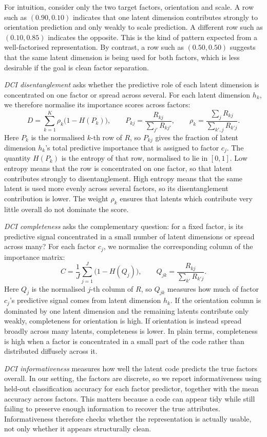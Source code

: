 For intuition, consider only the two target factors, orientation and scale. A row such as \((0.90,0.10)\) indicates that one latent dimension contributes strongly to orientation prediction and only weakly to scale prediction. A different row such as \((0.10,0.85)\) indicates the opposite. This is the kind of pattern expected from a well-factorised representation. By contrast, a row such as \((0.50,0.50)\) suggests that the same latent dimension is being used for both factors, which is less desirable if the goal is clean factor separation.

\emph{DCI disentanglement} asks whether the predictive role of each latent dimension is concentrated on one factor or spread across several. For each latent dimension \(h_k\), we therefore normalise its importance scores across factors:
\[
D=\sum_{k=1}^{K}\rho_k\bigl(1-H(P_k)\bigr),
\qquad
P_{kj}=\frac{R_{kj}}{\sum_{j'}R_{kj'}},
\qquad
\rho_k=\frac{\sum_j R_{kj}}{\sum_{k',j}R_{k'j}}.
\]
Here \(P_k\) is the normalised \(k\)-th row of \(R\), so \(P_{kj}\) gives the fraction of latent dimension \(h_k\)'s total predictive importance that is assigned to factor \(c_j\). The quantity \(H(P_k)\) is the entropy of that row, normalised to lie in \([0,1]\). Low entropy means that the row is concentrated on one factor, so that latent contributes strongly to disentanglement. High entropy means that the same latent is used more evenly across several factors, so its disentanglement contribution is lower. The weight \(\rho_k\) ensures that latents which contribute very little overall do not dominate the score.

\emph{DCI completeness} asks the complementary question: for a fixed factor, is its predictive signal concentrated in a small number of latent dimensions or spread across many? For each factor \(c_j\), we normalise the corresponding column of the importance matrix:
\[
C=\frac{1}{J}\sum_{j=1}^{J}\bigl(1-H(Q_j)\bigr),
\qquad
Q_{jk}=\frac{R_{kj}}{\sum_{k'}R_{k'j}}.
\]
Here \(Q_j\) is the normalised \(j\)-th column of \(R\), so \(Q_{jk}\) measures how much of factor \(c_j\)'s predictive signal comes from latent dimension \(h_k\). If the orientation column is dominated by one latent dimension and the remaining latents contribute only weakly, completeness for orientation is high. If orientation is instead spread broadly across many latents, completeness is lower. In plain terms, completeness is high when a factor is concentrated in a small part of the code rather than distributed diffusely across it.

\emph{DCI informativeness} measures how well the latent code predicts the true factors overall. In our setting, the factors are discrete, so we report informativeness using held-out classification accuracy for each factor predictor, together with the mean accuracy across factors. This matters because a code can appear tidy while still failing to preserve enough information to recover the true attributes. Informativeness therefore checks whether the representation is actually usable, not only whether it appears structurally clean.

